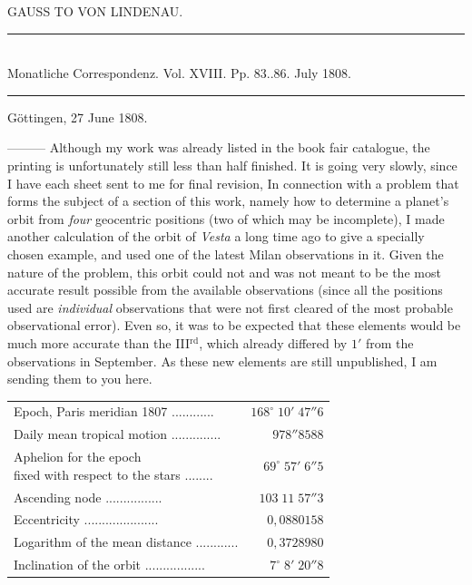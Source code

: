 \clearpage
{}
\hypertarget{native-306-lower}{}
\begin{center}GAUSS TO VON LINDENAU.
\end{center}

\begin{center}
\rule{4cm}{0.4pt}\\
\fontsize{10}{12}\selectfont Monatliche Correspondenz. Vol. XVIII. Pp. 83..86. July 1808.\\
\rule{4cm}{0.4pt}
\end{center}

\begin{flushright}
Göttingen, 27 June 1808.
\end{flushright}

\noindent —\;—\;— Although my work was already listed in the book fair catalogue, the printing is unfortunately still less than half finished. It is going very slowly, since I have each sheet sent to me for final revision, In connection with a problem that forms the subject of a section of this work, namely how to determine a planet’s orbit from \emph{four} geocentric positions (two of which may be incomplete), I made another calculation of the orbit of \emph{Vesta} a long time ago to give a specially chosen example, and used one of the latest Milan observations in it. Given the nature of the problem, this orbit could not and was not meant to be the most accurate result possible from the available observations (since all the positions used are \emph{individual} observations that were not first cleared of the most probable observational error). Even so, it was to be expected that these elements would be much more accurate than the III$^{\text{rd}}$, which already differed by $1'$ from the observations in September. As these new elements are still unpublished, I am sending them to you here.


\begin{center}\fontsize{9}{11}\selectfont\setlength{\tabcolsep}{3pt}\renewcommand{\arraystretch}{1.15}\begin{tabular}{lr}
Epoch, Paris meridian 1807 .\;.\;.\;.\;.\;.\;.\;.\;.\;.\;.\;.\; & $168^\circ\;10'\;47''6$\\
Daily mean tropical motion .\;.\;.\;.\;.\;.\;.\;.\;.\;.\;.\;.\;.\;.\; & $978''8588$\\
\shortstack[l]{Aphelion for the epoch\\fixed with respect to the stars} .\;.\;.\;.\;.\;.\;.\;.\; & $69^\circ\;57'\;6''5$\\
Ascending node .\;.\;.\;.\;.\;.\;.\;.\;.\;.\;.\;.\;.\;.\;.\;.\; & $103\;11\;57''3$\\
Eccentricity .\;.\;.\;.\;.\;.\;.\;.\;.\;.\;.\;.\;.\;.\;.\;.\;.\;.\;.\;.\;.\; & $0{,}0880158$\\
Logarithm of the mean distance .\;.\;.\;.\;.\;.\;.\;.\;.\;.\;.\;.\; & $0{,}3728980$\\
Inclination of the orbit .\;.\;.\;.\;.\;.\;.\;.\;.\;.\;.\;.\;.\;.\;.\;.\;.\; & $7^\circ\;8'\;20''8$\\
\end{tabular}\end{center}


